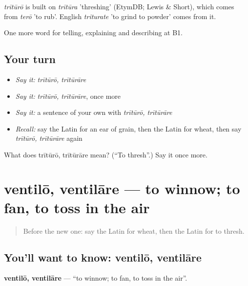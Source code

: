 \begin{cousinweb}
\emph{trītūrō} is built on \emph{trītūra} 'threshing' (EtymDB; Lewis \& Short), which comes from \emph{terō} 'to rub'. English \emph{triturate} 'to grind to powder' comes from it.
\end{cousinweb}

\begin{grammarlens}[title={What you've built}]
One more word for telling, explaining and describing at B1.
\end{grammarlens}

\subsection*{Your turn}
\begin{itemize}
\raggedright
  \item \emph{Say it:} \emph{trītūrō, trītūrāre}
  \item \emph{Say it:} \emph{trītūrō, trītūrāre}, once more
  \item \emph{Say it:} a sentence of your own with \emph{trītūrō, trītūrāre}
  \item \emph{Recall:} say the Latin for an ear of grain, then the Latin for wheat, then say \emph{trītūrō, trītūrāre} again
\end{itemize}

\begin{tcolorbox}[breakable,colback=teal!4,colframe=teal!35!black,title={Before you move on}]
What does trītūrō, trītūrāre mean? (\textquotedblleft{}To thresh\textquotedblright{}.) Say it once more.
\end{tcolorbox}
\section[ventilō, ventilāre]{ventilō, ventilāre — to winnow; to fan, to toss in the air}

\label{lesson:LA-C476-ventilo}



\begin{quote}
Before the new one: say the Latin for wheat, then the Latin for to thresh.
\end{quote}

\subsection*{You'll want to know: ventilō, ventilāre}
\textbf{ventilō, ventilāre} — \textquotedblleft{}to winnow; to fan, to toss in the air\textquotedblright{}.

